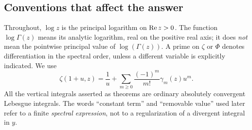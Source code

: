 \subsection{Conventions that affect the answer}
Throughout, $\log z$ is the principal logarithm on $\operatorname{Re} z>0$.
The function $\log\Gamma(z)$ means its analytic logarithm, real on the
positive real axis; it does \emph{not} mean the pointwise principal value
of $\log(\Gamma(z))$. A prime on $\zeta$ or $\Phi$ denotes differentiation
in the spectral order, unless a different variable is explicitly indicated.
We use
\begin{equation}\label{eq:laurent-convention}
 \zeta(1+u,z)=\frac1u+
      \sum_{m\ge0}\frac{(-1)^m}{m!}\gamma_m(z)u^m.
\end{equation}
All the vertical integrals asserted as theorems are ordinary absolutely
convergent Lebesgue integrals. The words ``constant term'' and ``removable
value'' used later refer to a finite \emph{spectral expression}, not to a
regularization of a divergent integral in $y$.
